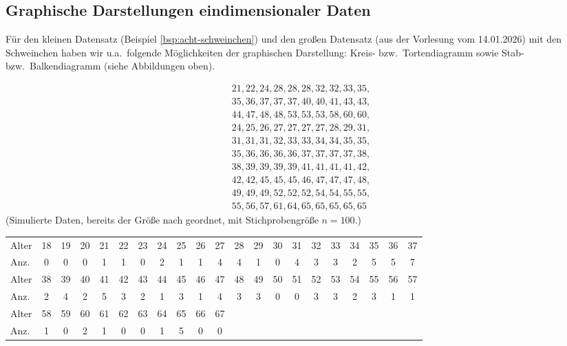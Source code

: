\subsection{Graphische Darstellungen eindimensionaler Daten}\label{subsec:graphische-darstellungen-eindimensionaler-daten}


Für den kleinen Datensatz (Beispiel \autoref{bsp:acht-schweinchen}) und den großen Datensatz (aus der Vorlesung vom 14.01.2026) mit den
Schweinchen haben wir u.a.\ folgende Möglichkeiten der graphischen Darstellung: Kreis- bzw.\ Tortendiagramm sowie Stab- bzw.\ Balkendiagramm (siehe Abbildungen oben).

\begin{bsp} 
    \[
        \begin{array}{l}
            21, 22, 24, 28, 28, 28, 32, 32, 33, 35,\\
            35, 36, 37, 37, 37, 40, 40, 41, 43, 43,\\
            44, 47, 48, 48, 53, 53, 53, 58, 60, 60,\\
            24, 25, 26, 27, 27, 27, 27, 28, 29, 31,\\
            31, 31, 31, 32, 33, 33, 34, 34, 35, 35,\\
            35, 36, 36, 36, 36, 37, 37, 37, 37, 38,\\
            38, 39, 39, 39, 39, 41, 41, 41, 41, 42,\\
            42, 42, 45, 45, 45, 46, 47, 47, 47, 48,\\
            49, 49, 49, 52, 52, 52, 54, 54, 55, 55,\\
            55, 56, 57, 61, 64, 65, 65, 65, 65, 65
        \end{array}
    \]
    (Simulierte Daten, bereits der Größe nach geordnet, mit Stichprobengröße $n=100$.)

    \begin{mytable}
        \small
        \begin{tabular}{l*{20}{c}}
            \hline
            Alter & 18&19&20&21&22&23&24&25&26&27&28&29&30&31&32&33&34&35&36&37\\
            Anz.
             & 0&0&0&1&1&0&2&1&1&4&4&1&0&4&3&3&2&5&5&7\\
            \hline
            Alter & 38&39&40&41&42&43&44&45&46&47&48&49&50&51&52&53&54&55&56&57\\
            Anz.
             & 2&4&2&5&3&2&1&3&1&4&3&3&0&0&3&3&2&3&1&1\\
            \hline
            Alter & 58&59&60&61&62&63&64&65&66&67& & & & & & & & & & \\
            Anz.
             & 1&0&2&1&0&0&1&5&0&0& & & & & & & & & &\\
            \hline
        \end{tabular}
    \end{mytable}


\end{bsp}
